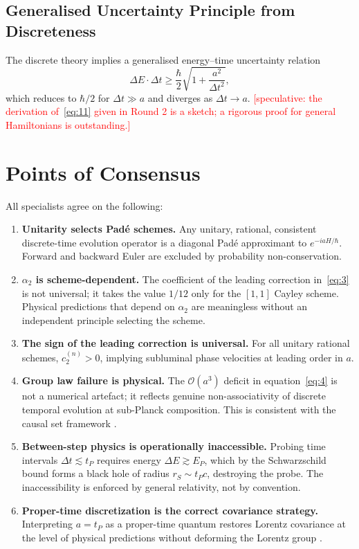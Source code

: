 \documentclass[11pt,a4paper]{article}
\begin{document}
\subsection{Generalised Uncertainty Principle from Discreteness}

The discrete theory implies a generalised energy--time uncertainty relation
\begin{equation}
  \Delta E\cdot\Delta t \geq \frac{\hbar}{2}\sqrt{1 + \frac{a^2}{\Delta t^2}},
  \label{eq:11}
\end{equation}
which reduces to $\hbar/2$ for $\Delta t\gg a$ and diverges as $\Delta t\to a$. \textcolor{red}{[speculative: the derivation of~\eqref{eq:11} given in Round 2 is a sketch; a rigorous proof for general Hamiltonians is outstanding.]}

\section{Points of Consensus}

All specialists agree on the following:

\begin{enumerate}
  \item \textbf{Unitarity selects Pad\'{e} schemes.} Any unitary, rational, consistent discrete-time evolution operator is a diagonal Pad\'{e} approximant to $e^{-iaH/\hbar}$. Forward and backward Euler are excluded by probability non-conservation.

  \item \textbf{$\alpha_2$ is scheme-dependent.} The coefficient of the leading correction in~\eqref{eq:3} is not universal; it takes the value $1/12$ only for the $[1,1]$ Cayley scheme. Physical predictions that depend on $\alpha_2$ are meaningless without an independent principle selecting the scheme.

  \item \textbf{The sign of the leading correction is universal.} For all unitary rational schemes, $c_2^{(n)}>0$, implying subluminal phase velocities at leading order in $a$.

  \item \textbf{Group law failure is physical.} The $\mathcal{O}(a^3)$ deficit in equation~\eqref{eq:4} is not a numerical artefact; it reflects genuine non-associativity of discrete temporal evolution at sub-Planck composition. This is consistent with the causal set framework \cite{henson2006}.

  \item \textbf{Between-step physics is operationally inaccessible.} Probing time intervals $\Delta t \lesssim t_P$ requires energy $\Delta E \gtrsim E_P$, which by the Schwarzschild bound forms a black hole of radius $r_S \sim t_P c$, destroying the probe. The inaccessibility is enforced by general relativity, not by convention.

  \item \textbf{Proper-time discretization is the correct covariance strategy.} Interpreting $a = t_P$ as a proper-time quantum restores Lorentz covariance at the level of physical predictions without deforming the Lorentz group \cite{ashtekar2004}.
\end{enumerate}
\end{document}

